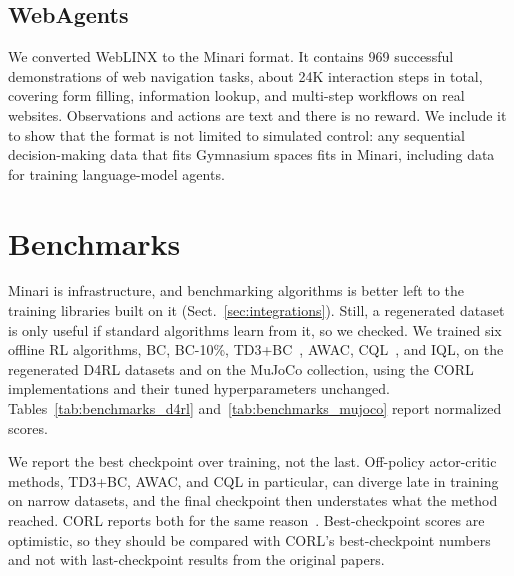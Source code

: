 \documentclass{article}
\begin{document}
\subsection{WebAgents}
\label{sec:webagents}
We converted WebLINX \citep{weblinx} to the Minari format. It contains 969 successful demonstrations of web navigation tasks, about 24K interaction steps in total, covering form filling, information lookup, and multi-step workflows on real websites. Observations and actions are text and there is no reward. We include it to show that the format is not limited to simulated control: any sequential decision-making data that fits Gymnasium spaces fits in Minari, including data for training language-model agents.


\section{Benchmarks}
\label{sec:benchmarks}

Minari is infrastructure, and benchmarking algorithms is better left to the training libraries built on it (Sect.~\ref{sec:integrations}). Still, a regenerated dataset is only useful if standard algorithms learn from it, so we checked. We trained six offline RL algorithms, BC, BC-10\%, TD3+BC~\citep{TD3+BC}, AWAC, CQL~\citep{CQL}, and IQL, on the regenerated D4RL datasets and on the MuJoCo collection, using the CORL~\citep{corl} implementations and their tuned hyperparameters unchanged. Tables~\ref{tab:benchmarks_d4rl} and~\ref{tab:benchmarks_mujoco} report normalized scores.

We report the best checkpoint over training, not the last. Off-policy actor-critic methods, TD3+BC, AWAC, and CQL in particular, can diverge late in training on narrow datasets, and the final checkpoint then understates what the method reached. CORL reports both for the same reason~\citep{corl}. Best-checkpoint scores are optimistic, so they should be compared with CORL's best-checkpoint numbers and not with last-checkpoint results from the original papers.
\end{document}
